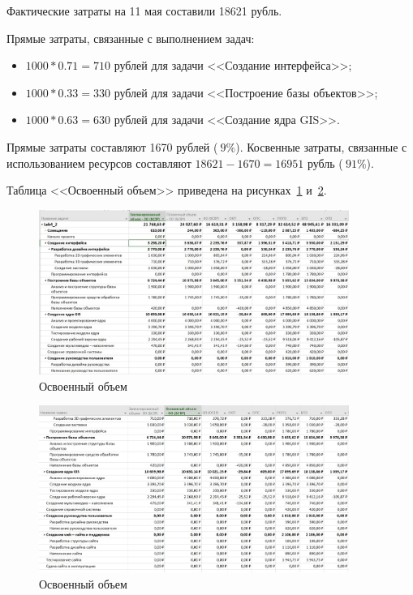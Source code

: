 Фактические затраты на 11 мая составили 18621 рубль.

Прямые затраты, связанные с выполнением задач:
\begin{itemize}[label=---]
	\item $1000 * 0.71 = 710$ рублей для задачи <<Создание интерфейса>>;
	\item $1000 * 0.33 = 330$ рублей для задачи <<Построение базы объектов>>;
	\item $1000 * 0.63 = 630$ рублей для задачи <<Создание ядра GIS>>.
\end{itemize}

Прямые затраты составляют 1670 рублей ($~9\%$).
Косвенные затраты, связанные с использованием ресурсов составляют $18621 - 1670 = 16951$ рубль ($~91\%$).

Таблица <<Освоенный объем>> приведена на рисунках~\ref{fig:screen4} и~\ref{fig:screen5}.

\begin{figure}[H]
	\centering
	\includegraphics[width=0.9\textwidth]{img/screen2_1.jpg}
	\caption{Освоенный объем}
	\label{fig:screen4}
\end{figure}

\begin{figure}[H]
	\centering
	\includegraphics[width=0.9\textwidth]{img/screen2_2.jpg}
	\caption{Освоенный объем}
	\label{fig:screen5}
\end{figure}

